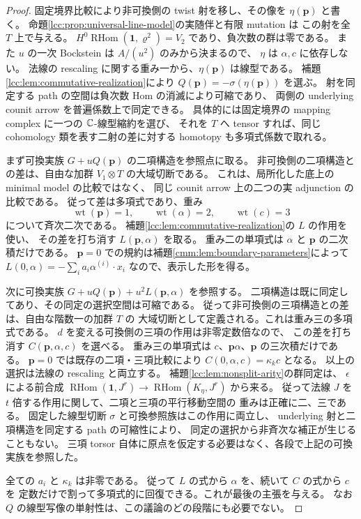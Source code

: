 \begin{proof}
固定境界比較により非可換側の twist 射を移し、その像を $\eta(\mathbf p)$ と書く。
命題\ref{lcc:prop:universal-line-model}の実随伴と有限 mutation は
この射を全 $T$ 上で与える。
$H^0\operatorname{RHom}(\mathbf1,\varrho^2)=V_2$ であり、負次数の群は零である。
また $u$ の一次 Bockstein は $A/(u^2)$ のみから決まるので、
$\eta$ は $\alpha,c$ に依存しない。
法線の rescaling に関する重み一から、$\eta(\mathbf p)$ は線型である。
補題\ref{lcc:lem:commutative-realization}により
$Q(\mathbf p)=-\sigma(\eta(\mathbf p))$ を選ぶ。
射を同定する path の空間は負次数 Hom の消滅により可縮であり、
両側の underlying counit arrow を普遍係数上で同定できる。
具体的には固定境界の mapping complex に一つの $\mathbb C$-線型縮約を選び、
それを $T$ へ tensor すれば、同じ cohomology 類を表す二射の差に対する
homotopy も多項式係数で取れる。

まず可換実族 $G+uQ(\mathbf p)$ の二項構造を参照点に取る。
非可換側の二項構造との差は、自由な加群 $V_1\otimes T$ の大域切断である。
これは、局所化した底上の minimal model の比較ではなく、
同じ counit arrow 上の二つの実 adjunction の比較である。
従って差は多項式であり、重み
\[
 \operatorname{wt}(\mathbf p)=1,\qquad
 \operatorname{wt}(\alpha)=2,\qquad
 \operatorname{wt}(c)=3
\]
について斉次二次である。
補題\ref{lcc:lem:commutative-realization}の $L$ の作用を使い、
その差を打ち消す $L(\mathbf p,\alpha)$ を取る。
重み二の単項式は $\alpha$ と $\mathbf p$ の二次積だけである。
$\mathbf p=0$ での規約は補題\ref{cmm:lem:boundary-parameters}によって
$L(0,\alpha)=-\sum_i a_i\alpha^{(i)}\cdot x_i$ なので、表示した形を得る。

次に可換実族 $G+uQ(\mathbf p)+u^2L(\mathbf p,\alpha)$ を参照する。
二項構造は既に同定してあり、その同定の選択空間は可縮である。
従って非可換側の三項構造との差は、自由な階数一の加群 $T$ の
大域切断として定義される。これは重み三の多項式である。
$d$ を変える可換側の三項の作用は非零定数倍なので、
この差を打ち消す $C(\mathbf p,\alpha,c)$ を選べる。
重み三の単項式は $c$、$\mathbf p\alpha$、$\mathbf p$ の三次積だけである。
$\mathbf p=0$ では既存の二項・三項比較により $C(0,\alpha,c)=\kappa_kc$ となる。
以上の選択は法線の rescaling と両立する。
補題\ref{lcc:lem:nonsplit-arity}の群同定は、
$\epsilon$ による前合成 $\operatorname{RHom}(\mathbf1,J^r)\to
\operatorname{RHom}(K_\eta,J^r)$ から来る。
従って法線 $J$ を $t$ 倍する作用に関して、二項と三項の平行移動空間の
重みは正確に二、三である。
固定した線型切断 $\sigma$ と可換参照族はこの作用に両立し、
underlying 射と二項構造を同定する path の可縮性により、
同定の選択から非斉次な補正が生じることもない。
三項 torsor 自体に原点を仮定する必要はなく、各段で上記の可換実族を参照した。

全ての $a_i$ と $\kappa_k$ は非零である。
従って $L$ の式から $\alpha$ を、続いて $C$ の式から $c$ を
定数だけで割って多項式的に回復できる。これが最後の主張を与える。
なお $Q$ の線型写像の単射性は、この議論のどの段階にも必要でない。
\end{proof}

